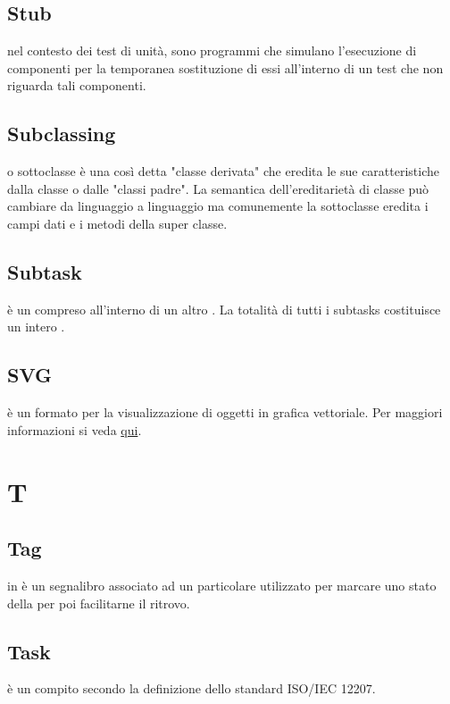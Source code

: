 \documentclass[12pt,a4paper]{article}
\begin{document}
\subsection{Stub} 
nel contesto dei test di unità, sono programmi che simulano l'esecuzione di componenti  per la temporanea sostituzione di essi all'interno di un test  che non riguarda tali componenti.

\subsection{Subclassing} 
o sottoclasse è una così detta "classe derivata" che eredita le sue caratteristiche dalla classe o dalle "classi padre". La semantica dell'ereditarietà di classe può cambiare da linguaggio a linguaggio ma comunemente la sottoclasse eredita i campi dati e i metodi della super classe.

\subsection{Subtask} 
è un  compreso all'interno di un altro . La totalità di tutti i subtasks costituisce un intero .

\subsection{SVG} 
è un formato per la visualizzazione di oggetti in grafica vettoriale. Per maggiori informazioni si veda \href{https://it.wikipedia.org/wiki/Scalable_Vector_Graphics}{qui}.




\newpage

\section{T}


\subsection{Tag} 
in  è un segnalibro associato ad un particolare  utilizzato per marcare uno stato della  per poi facilitarne il ritrovo.

\subsection{Task} 
è un compito secondo la definizione dello standard ISO/IEC 12207.
\end{document}
